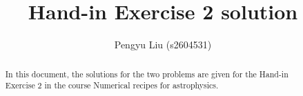 \documentclass[a4paper,10pt]{article}
\title{Hand-in Exercise 2 solution}
\author{Pengyu Liu (s2604531)}
\begin{document}
\maketitle

\begin{abstract}
In this document, the solutions for the two problems are given for the Hand-in Exercise 2 in the course Numerical recipes for astrophysics.

\end{abstract}




\end{document}
